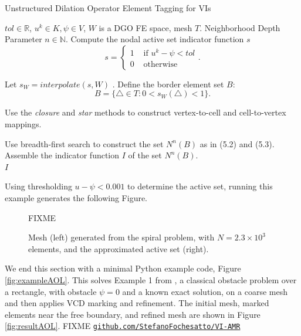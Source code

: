 \documentclass[]{interact}
\theoremstyle{plain}%
\theoremstyle{definition}
\theoremstyle{remark}
\begin{document}
\begin{algorithm}[H]
  \caption{Unstructured Dilation Operator Element Tagging for VIs}
  \begin{algorithmic}[1]
    \Require $tol \in \mathbb{R}$, $u^k \in K, \psi \in V$, $W$ is a DGO FE space, mesh $T$.
    \Require Neighborhood Depth Parameter $n \in \mathbb{N}$.
    \State Compute the nodal active set indicator function $s$
    \begin{equation}
    s = \begin{cases}
      1 & \text{ if } u^k - \psi < tol\\
      0 & \text{ otherwise}
    \end{cases}.
    \end{equation}
  
    \State Let $s_W = interpolate(s, W)$ .
    \State Define the border element set $B$:
    \begin{equation}
    B = \{\triangle \in T: 0 < s_W(\triangle) < 1 \} .
    \end{equation}

    \State Use the \emph{closure} and \emph{star} methods to construct vertex-to-cell and cell-to-vertex mappings.

    \State Use breadth-first search to construct the set $N^n(B)$ as in (5.2) and (5.3). 
    \State Assemble the indicator function $I$ of the set $N^n(B)$. \\
    \Return $I$
  \end{algorithmic}
  \end{algorithm}

Using thresholding $u - \psi < 0.001$ to determine the active set, running this example generates the following Figure.

\begin{figure}[ht]
FIXME
\caption{Mesh (left) generated from the spiral problem, with $N=2.3\times 10^3$ elements, and the approximated active set (right).}
\end{figure}

We end this section with a minimal Python example code, Figure \ref{fig:exampleAOL}.  This solves Example 1 from \cite{AinsworthOdenLee1993}, a classical obstacle problem over a rectangle, with obstacle $\psi=0$ and a known exact solution, on a coarse mesh and then applies VCD marking and refinement.  The initial mesh, marked elements near the free boundary, and refined mesh are shown in Figure \ref{fig:resultAOL}.  FIXME \href{https://github.com/StefanoFochesatto/VI-AMR}{\texttt{github.com/StefanoFochesatto/VI-AMR}}
\end{document}

